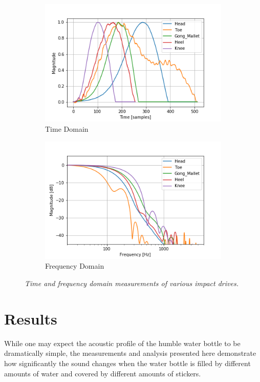 \documentclass[twoside,a4paper]{article}
\begin{document}
\begin{figure}[t]
\centering
    \begin{subfigure}[b]{\columnwidth}
         \centering
         \includegraphics[width=\linewidth,trim={0 0 1cm 1cm},clip]{../Figures/Impacts_time}
         \caption{Time Domain}
    \end{subfigure}
    \begin{subfigure}[b]{\columnwidth}
         \centering
         \includegraphics[width=\linewidth,trim={0 0 1cm 1cm},clip]{../Figures/Impacts_freq}
         \caption{Frequency Domain}
    \end{subfigure}
    \caption{\it{Time and frequency domain measurements of various impact drives.}}
    \label{fig:impact}
\end{figure}


\section{Results} \label{sec:results}
%
While one may expect the acoustic profile of the humble water bottle to be dramatically simple, the measurements and analysis presented here demonstrate how significantly the sound changes when the water bottle is filled by different amounts of water and covered by different amounts of stickers. 
\end{document}
